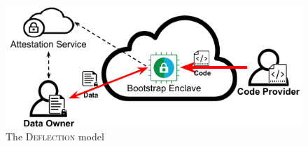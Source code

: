 \begin{figure}[htbp]
\centerline{\includegraphics[scale=0.72]{figures/fg-deflection-model.pdf}}
\caption{The \textsc{Deflection} model}\label{fg-cat}
\vspace{-10pt}
\end{figure}